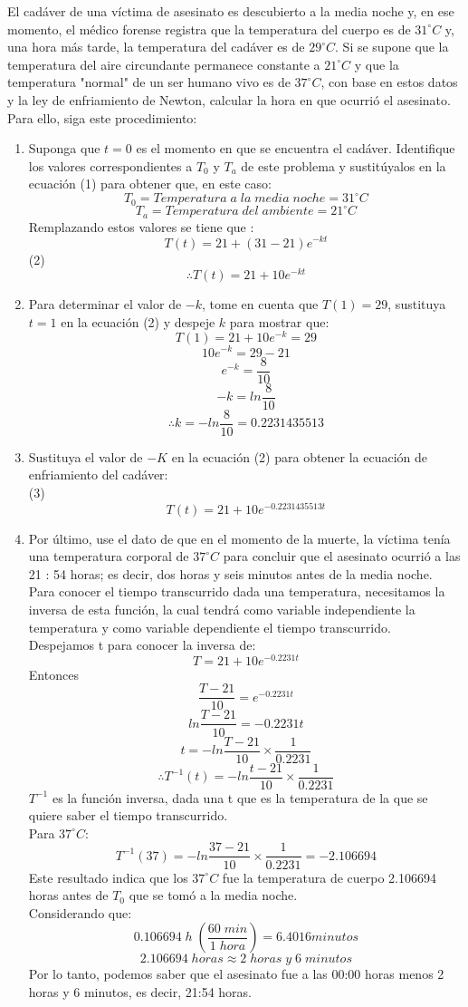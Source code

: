 \documentclass[12pt]{article}
\begin{document}
El cadáver de una víctima de asesinato es descubierto a la media noche y, en ese momento,
el médico forense registra que la temperatura del cuerpo es de $31  ^{\circ} C$ y, una hora más tarde, la temperatura del cadáver es de $29  ^{\circ} C $. 
Si se supone que la temperatura del aire circundante permanece constante a $21 ^{\circ}  C$ y que la temperatura "normal" de un ser humano vivo es de $37  ^{\circ} C$, con base en estos datos y la ley de enfriamiento de Newton, calcular la hora en que ocurrió el asesinato. Para ello, siga este procedimiento:
\begin{enumerate}
\item Suponga que $t = 0$ es el momento en que se encuentra el cadáver. Identifique los valores
correspondientes a $T_0$ y $T_a$ de este problema y sustitúyalos en la ecuación (1) para obtener
que, en este caso:
\[
T_0 = Temperatura \;a \;la\; media \;noche= 31  ^{\circ} C
\]
\[
T_a = Temperatura \;del \;ambiente = 21 ^{\circ}  C
\]
Remplazando estos valores se tiene que : 
\[
T(t)= 21 + (31-21)e^{-kt}
\]
(2)
\[
\therefore  T(t)= 21 + 10e^{-kt}
\]  
\item Para determinar el valor de $-k$, tome en cuenta que $T(1) = 29$, sustituya $t = 1$ en la ecuación (2) y despeje $k$ para mostrar que:
\[
 T(1)= 21 + 10e^{-k} = 29
\]  
\[
 10e^{-k} = 29-21
\]  
\[
  e^{-k} = \frac{8}{10}
\]  
\[
 -k = ln\frac{8}{10}
\]  
\[
 \therefore  k = -ln\frac{8}{10} = 0.2231435513
\] 
\item Sustituya el valor de $-K$ en la ecuación (2) para obtener la ecuación de enfriamiento del
cadáver:\\
(3)
\[
T(t)= 21 + 10e^{-0.2231435513t}
\] 
\item Por último, use el dato de que en el momento de la muerte, la víctima tenía una temperatura
corporal de $37  ^{\circ} C$ para concluir que el asesinato ocurrió a las 21 : 54 horas; es decir, dos horas y seis minutos antes de la media noche.
\\
Para conocer el tiempo transcurrido dada una temperatura, necesitamos la inversa de esta función, la cual tendrá como variable independiente la temperatura y como variable dependiente el tiempo transcurrido. \\
Despejamos t para conocer la inversa de: 
\[
T= 21 + 10e^{-0.2231t}
\] 
Entonces
\[
\frac{T-21}{10}= e^{-0.2231t}
\] 
\[
ln \frac{T-21}{10}= -0.2231t
\] 
\[
t = -ln \frac{T-21}{10} \times \frac{1}{0.2231}
\]
\[
\therefore T^{-1}(t) = -ln \frac{t-21}{10} \times \frac{1}{0.2231}
\]
$T^{-1}$ es la función inversa, dada una t que es la temperatura de la que se quiere saber el tiempo transcurrido.\\
Para  $37  ^{\circ} C$:
\[
T^{-1}(37) = -ln \frac{37-21}{10} \times \frac{1}{0.2231} = -2.106694
\]
Este resultado indica que los $37  ^{\circ} C$ fue la temperatura de cuerpo 2.106694 horas antes de $T_0$ que se tomó a la media noche.\\
Considerando que:
\[
	0.106694\;h \;(\frac{60 \; min}{1\; hora}) = 6.4016 minutos
\]
\[
2.106694 \; horas \approx 2 \;horas \;y \;6 \;minutos
\]
Por lo tanto, podemos saber que el asesinato fue a las 00:00 horas menos 2 horas y 6 minutos, es decir, 21:54 horas.
\end{enumerate}
\end{document}
